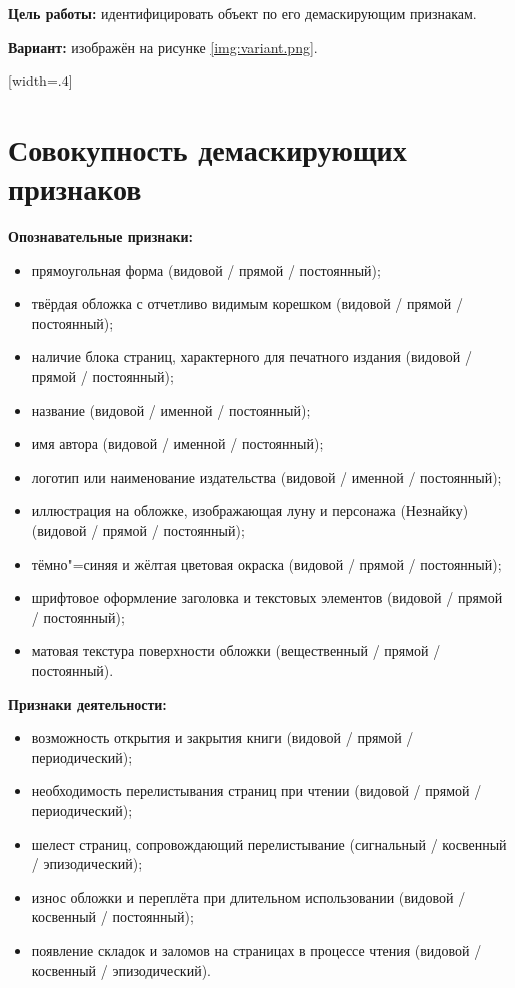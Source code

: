 \documentclass{bsuir}
\begin{document}
\maketitle
\mainmatter

\textbf{Цель работы:} идентифицировать объект по его демаскирующим признакам.

\textbf{Вариант:} изображён на рисунке \ref{img:variant.png}.

[width=.4\textwidth]

\section{Совокупность демаскирующих признаков}

\textbf{Опознавательные признаки:}

\begin{itemize}
    \item прямоугольная форма (видовой / прямой / постоянный);
    \item твёрдая обложка с отчетливо видимым корешком (видовой / прямой / постоянный);
    \item наличие блока страниц, характерного для печатного издания (видовой / прямой / постоянный);
    \item название  (видовой / именной / постоянный);
    \item имя автора  (видовой / именной / постоянный);
    \item логотип или наименование издательства  (видовой / именной / постоянный);
    \item иллюстрация на обложке, изображающая луну и персонажа (Незнайку) (видовой / прямой / постоянный);
    \item тёмно"=синяя и жёлтая цветовая окраска (видовой / прямой / постоянный);
    \item шрифтовое оформление заголовка и текстовых элементов (видовой / прямой / постоянный);
    \item матовая текстура поверхности обложки (вещественный / прямой / постоянный).
\end{itemize}

\textbf{Признаки деятельности:}

\begin{itemize}
    \item возможность открытия и закрытия книги (видовой / прямой / периодический);
    \item необходимость перелистывания страниц при чтении (видовой / прямой / периодический);
    \item шелест страниц, сопровождающий перелистывание (сигнальный / косвенный / эпизодический);
    \item износ обложки и переплёта при длительном использовании (видовой / косвенный / постоянный);
    \item появление складок и заломов на страницах в процессе чтения (видовой / косвенный / эпизодический).
\end{itemize}
\end{document}
